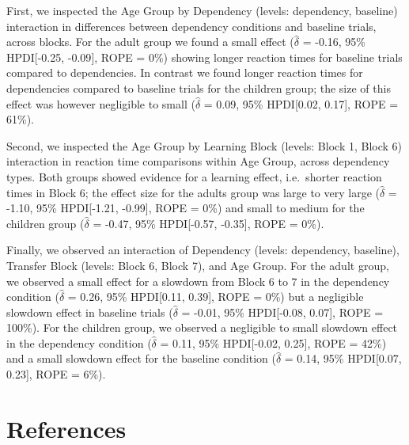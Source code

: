 \documentclass[
  english,
  man,floatsintext]{apa7}
\begin{document}
First, we inspected the Age Group by Dependency (levels: dependency, baseline) interaction in differences between dependency conditions and baseline trials, across blocks. For the adult group we found a small effect (\(\hat{\delta}\) = -0.16, 95\% HPDI{[}-0.25, -0.09{]}, ROPE = 0\%) showing longer reaction times for baseline trials compared to dependencies. In contrast we found longer reaction times for dependencies compared to baseline trials for the children group; the size of this effect was however negligible to small (\(\hat{\delta}\) = 0.09, 95\% HPDI{[}0.02, 0.17{]}, ROPE = 61\%).

Second, we inspected the Age Group by Learning Block (levels: Block 1, Block 6) interaction in reaction time comparisons within Age Group, across dependency types. Both groups showed evidence for a learning effect, i.e.~shorter reaction times in Block 6; the effect size for the adults group was large to very large (\(\hat{\delta}\) = -1.10, 95\% HPDI{[}-1.21, -0.99{]}, ROPE = 0\%) and small to medium for the children group (\(\hat{\delta}\) = -0.47, 95\% HPDI{[}-0.57, -0.35{]}, ROPE = 0\%).

Finally, we observed an interaction of Dependency (levels: dependency, baseline), Transfer Block (levels: Block 6, Block 7), and Age Group. For the adult group, we observed a small effect for a slowdown from Block 6 to 7 in the dependency condition (\(\hat{\delta}\) = 0.26, 95\% HPDI{[}0.11, 0.39{]}, ROPE = 0\%) but a negligible slowdown effect in baseline trials (\(\hat{\delta}\) = -0.01, 95\% HPDI{[}-0.08, 0.07{]}, ROPE = 100\%). For the children group, we observed a negligible to small slowdown effect in the dependency condition (\(\hat{\delta}\) = 0.11, 95\% HPDI{[}-0.02, 0.25{]}, ROPE = 42\%) and a small slowdown effect for the baseline condition (\(\hat{\delta}\) = 0.14, 95\% HPDI{[}0.07, 0.23{]}, ROPE = 6\%).

\newpage

\hypertarget{references}{%
\section{References}\label{references}}

\begingroup
\setlength{\parindent}{-0.5in}
\setlength{\leftskip}{0.5in}

\hypertarget{ref}{}

\endgroup
\end{document}
